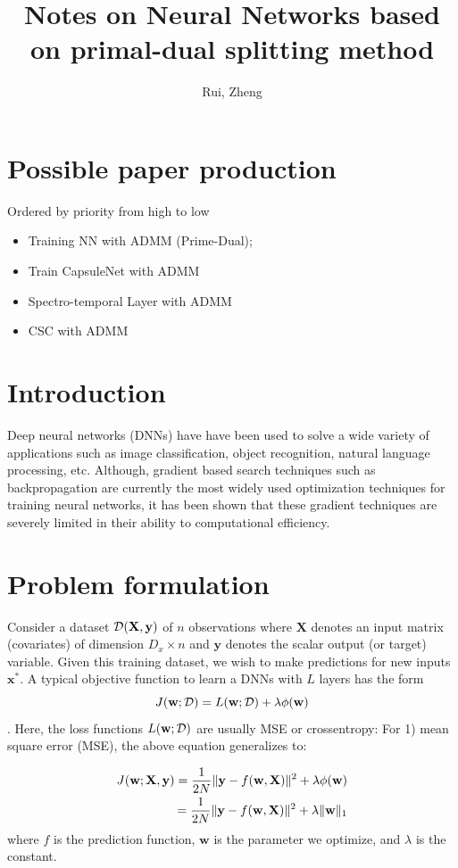 \documentclass[11pt,a4paper]{article}
\title{Notes on Neural Networks based on primal-dual splitting method }
\author{Rui, Zheng}
\begin{document}
\maketitle

\tableofcontents
\section{Possible paper production}
Ordered by priority from high to low
\begin{itemize}
	\item Training NN with ADMM (Prime-Dual); 
	\item Train CapsuleNet with ADMM
	\item Spectro-temporal Layer with ADMM
	\item CSC with ADMM
\end{itemize}
\section{Introduction}
Deep neural networks (DNNs) have  have been used to solve a wide variety of applications such as image classification, object recognition, natural language processing, etc. Although, gradient based search techniques such as backpropagation
are currently the most widely used optimization techniques for training neural networks, it has been shown that these gradient techniques are severely limited in their ability to computational efficiency. 
\section{Problem formulation}
Consider a dataset $\mathcal{D}(\mathbf{X}, \mathbf{y})$ of $n$ observations where $\mathbf{X}$ denotes an input matrix (covariates) of dimension $D_x \times n$ and $\mathbf{y}$ denotes the scalar output (or target) variable.  Given this training dataset,  we wish to make predictions for new inputs $\mathbf{x}^*$. A typical objective function to learn a DNNs with $L$ layers has the
form 
\begin{equation}
J(\mathbf{w}; \mathcal{D}) = L(\mathbf{w}; \mathcal{D}) + \lambda \phi (\mathbf{w})
\end{equation}. 
Here, the loss functions $L(\mathbf{w}; \mathcal{D})$ are usually MSE or crossentropy:
For 1) mean square error (MSE), the above equation generalizes to:

\begin{equation}
\begin{split}
\label{eq:objective_mse}
J(\mathbf{w}; \mathbf{X}, \mathbf{y}) = \frac{1}{2N}\lVert\mathbf{y} - f(\mathbf{w}, \mathbf{X})\rVert^2 + \lambda \phi(\mathbf{w}) \\
= \frac{1}{2N}\lVert\mathbf{y} - f(\mathbf{w}, \mathbf{X})\rVert^2 + \lambda \| \mathbf{w} \|_1
\end{split}
\end{equation}
where $f$ is the prediction function, $\mathbf{w}$ is the parameter we optimize,  and $\lambda$ is the constant. 
\end{document}
